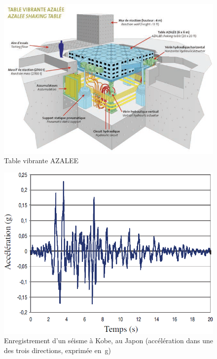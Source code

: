 \documentclass[10pt,fleqn]{article} %
\begin{document}
\begin{multicols}{2}
\begin{figure}[H]
\centering
\includegraphics[width=\linewidth]{fig_01}
\caption{Table vibrante AZALEE \label{fig_01}}
\end{figure}

\begin{figure}[H]
\centering
\includegraphics[width=\linewidth]{fig_02}
\caption{Enregistrement d’un séisme à Kobe, au Japon (accélération dans une des trois directions, exprimée en~g) \label{fig_02}}
\end{figure}

\end{multicols}
\end{document}

